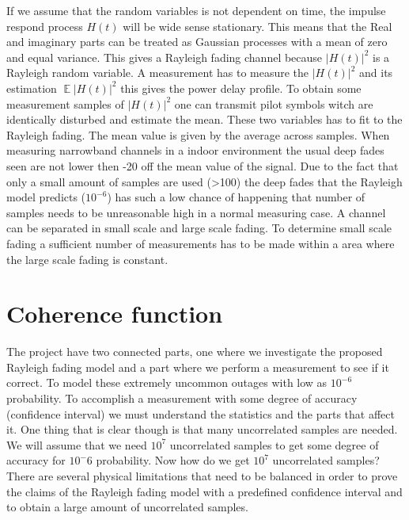 If we assume that the random variables is not dependent on time, the impulse respond process $H(t)$ will be wide sense stationary. This means that the Real and imaginary parts can be treated as Gaussian processes with a mean of zero and equal variance. This gives a Rayleigh fading channel because $ \left | H(t) \right |^2 $ is a Rayleigh random variable.
A measurement has to measure the $ \left | H(t) \right |^2 $ and its estimation $ \mathop{\mathbb{E}}\left | H(t) \right |^2 $ this gives the power delay profile. To obtain some measurement samples of $ \left | H(t) \right |^2 $ one can transmit pilot symbols witch are identically disturbed and estimate the mean.\citep{MeasurementComplexRay}
These two variables has to fit to the Rayleigh fading. The mean value is given by the average across samples.
When measuring narrowband channels in a indoor environment the usual deep fades seen are not lower then -20 off the mean value of the signal. Due to the fact that only a small amount of samples are used (>100) the deep fades that the Rayleigh model predicts ($10^{-6}$) has such a low chance of happening that number of samples needs to be unreasonable high in a normal measuring case.
A  channel can be separated in  small scale and large scale fading. To determine small scale fading a sufficient number of measurements has to be made within a area where the large scale fading is constant.



\section{Coherence function}
The project have two connected parts, one where we investigate the proposed Rayleigh fading model and a part where we perform a measurement to see if it correct.  To model these extremely uncommon outages with low as $10^{-6}$ probability. To accomplish a measurement with some degree of accuracy (confidence interval) we must understand the statistics and the parts that affect it. One thing that is clear though is that many uncorrelated samples are needed. We will assume that we need $10^7$ uncorrelated samples to get some degree of accuracy for $10^-6$ probability. Now how do we get $10^7$ uncorrelated samples?
There are several physical limitations that need to be balanced  in order to prove the claims of the Rayleigh fading model with a predefined confidence interval and to obtain a large amount of uncorrelated samples.

